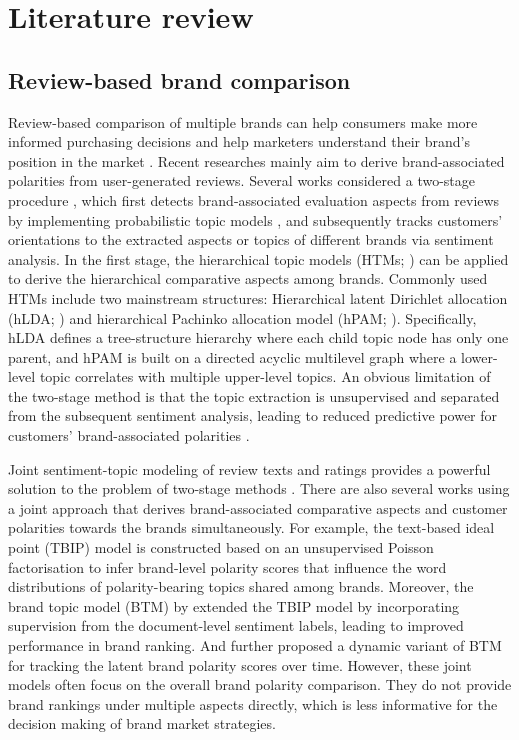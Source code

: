 \section{Literature review}
\label{literature}
\subsection{Review-based brand comparison}
Review-based comparison of multiple brands can help consumers make more informed purchasing decisions and help marketers understand their brand's position in the market \citep{colladon2018semantic,mitra2020obim}. 
Recent researches mainly aim to derive brand-associated polarities from user-generated reviews. 
Several works considered a two-stage procedure \citep{zhang2015dynamic,barry2018alcohol,sajid2022using}, which first detects brand-associated evaluation aspects from reviews by implementing probabilistic topic models \citep{lda, vayansky2020review}, and subsequently tracks customers' orientations to the extracted aspects or topics of different brands via sentiment analysis. 
In the first stage, the hierarchical topic models (HTMs; \citealt{liu2016overview}) can be applied to derive the hierarchical comparative aspects among brands.
Commonly used HTMs include two mainstream structures: Hierarchical latent Dirichlet allocation (hLDA; \citealt{blei2010nested}) and hierarchical Pachinko allocation model (hPAM; \citealt{hPAM}). 
Specifically, hLDA defines a tree-structure hierarchy where each child topic node has only one parent, and hPAM is built on a directed acyclic multilevel graph where a lower-level topic correlates with multiple upper-level topics.
An obvious limitation of the two-stage method is that the topic extraction is unsupervised and separated from the subsequent sentiment analysis, leading to reduced predictive power for customers' brand-associated polarities \citep{slda}.

Joint sentiment-topic modeling of review texts and ratings provides a powerful solution to the problem of two-stage methods \citep{Tech2023}.
There are also several works using a joint approach that derives brand-associated comparative aspects and customer polarities towards the brands simultaneously. 
For example, the text-based ideal point (TBIP) model \citep{vafa2020text} is constructed based on an unsupervised Poisson factorisation  to infer brand-level polarity scores that influence the word distributions of polarity-bearing topics shared among brands. Moreover, the brand topic model (BTM) by \citet{zhao-etal-2021-adversarial} extended the TBIP model by incorporating supervision from the document-level sentiment labels, leading to improved performance in brand ranking. And \citet{zhao2023tracking} further proposed a dynamic variant of BTM for tracking the latent brand polarity scores over time. 
However, these joint models often focus on the overall brand polarity comparison. They do not provide brand rankings under multiple aspects directly, which is less informative for the decision making of brand market strategies.




